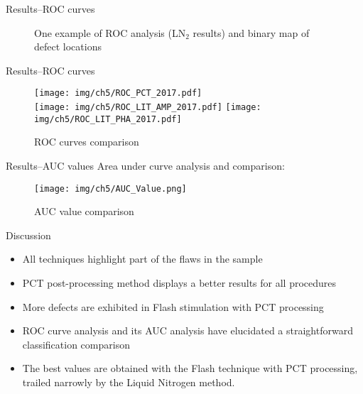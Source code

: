 \begin{frame}{Results--\small{ROC curves}}
    \begin{figure}[ht]
       \centering
       \caption{One example of ROC analysis (LN$_2$ results) and binary map of defect locations}
    \end{figure}
\end{frame}


\begin{frame}{Results--\small{ROC curves}}
    \begin{figure}
        \centering
            \texttt{[image: img/ch5/ROC\_PCT\_2017.pdf]}
        \\
            \texttt{[image: img/ch5/ROC\_LIT\_AMP\_2017.pdf]}
            \texttt{[image: img/ch5/ROC\_LIT\_PHA\_2017.pdf]}
        \caption{ROC curves comparison}
    \end{figure}

\end{frame}


\begin{frame}{Results--\small{AUC values}}
Area under curve analysis and comparison:
    \begin{figure}[ht]
        \vspace*{-5pt}
        \centering
        \texttt{[image: img/ch5/AUC\_Value.png]}
        \caption{AUC value comparison}
    \end{figure}
\end{frame}


\begin{frame}{Discussion}
    \begin{itemize}[<+->]
    \pause
        \item All techniques highlight part of the flaws in the sample
        \item PCT post-processing method displays a better results for all procedures
        \item More defects are exhibited in Flash stimulation with PCT processing
        \item ROC curve analysis and its AUC analysis have elucidated a  straightforward classification comparison
        \item The best values are obtained with the Flash technique with PCT processing, trailed narrowly by the Liquid Nitrogen method.
    \end{itemize}
\end{frame}
